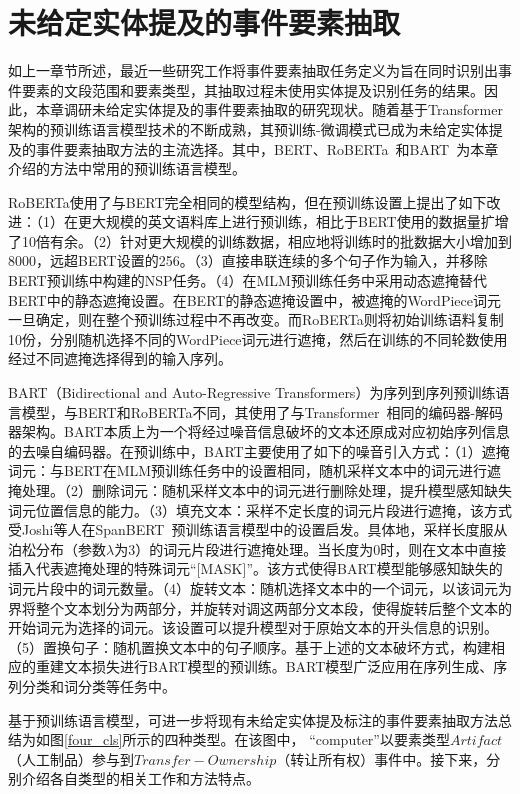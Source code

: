 \section{未给定实体提及的事件要素抽取}
\label{no_entity}
如上一章节所述，最近一些研究工作将事件要素抽取任务定义为旨在同时识别出事件要素的文段范围和要素类型，其抽取过程未使用实体提及识别任务的结果。因此，本章调研未给定实体提及的事件要素抽取的研究现状。随着基于Transformer架构的预训练语言模型技术的不断成熟，其预训练-微调模式已成为未给定实体提及的事件要素抽取方法的主流选择。其中，BERT、RoBERTa~\cite{liu2019roberta}和BART~\cite{lewis2020bart}为本章介绍的方法中常用的预训练语言模型。

RoBERTa使用了与BERT完全相同的模型结构，但在预训练设置上提出了如下改进：（1）在更大规模的英文语料库上进行预训练，相比于BERT使用的数据量扩增了10倍有余。（2）针对更大规模的训练数据，相应地将训练时的批数据大小增加到8000，远超BERT设置的256。（3）直接串联连续的多个句子作为输入，并移除BERT预训练中构建的NSP任务。（4）在MLM预训练任务中采用动态遮掩替代BERT中的静态遮掩设置。在BERT的静态遮掩设置中，被遮掩的WordPiece词元一旦确定，则在整个预训练过程中不再改变。而RoBERTa则将初始训练语料复制10份，分别随机选择不同的WordPiece词元进行遮掩，然后在训练的不同轮数使用经过不同遮掩选择得到的输入序列。

BART（Bidirectional and Auto-Regressive Transformers）为序列到序列预训练语言模型，与BERT和RoBERTa不同，其使用了与Transformer~\cite{vaswani2017attention}相同的编码器-解码器架构。BART本质上为一个将经过噪音信息破坏的文本还原成对应初始序列信息的去噪自编码器。在预训练中，BART主要使用了如下的噪音引入方式：（1）遮掩词元：与BERT在MLM预训练任务中的设置相同，随机采样文本中的词元进行遮掩处理。（2）删除词元：随机采样文本中的词元进行删除处理，提升模型感知缺失词元位置信息的能力。（3）填充文本：采样不定长度的词元片段进行遮掩，该方式受Joshi等人在SpanBERT~\cite{joshi2020spanbert}预训练语言模型中的设置启发。具体地，采样长度服从泊松分布（参数$\lambda$为3）的词元片段进行遮掩处理。当长度为0时，则在文本中直接插入代表遮掩处理的特殊词元“[MASK]”。该方式使得BART模型能够感知缺失的词元片段中的词元数量。（4）旋转文本：随机选择文本中的一个词元，以该词元为界将整个文本划分为两部分，并旋转对调这两部分文本段，使得旋转后整个文本的开始词元为选择的词元。该设置可以提升模型对于原始文本的开头信息的识别。（5）置换句子：随机置换文本中的句子顺序。基于上述的文本破坏方式，构建相应的重建文本损失进行BART模型的预训练。BART模型广泛应用在序列生成、序列分类和词分类等任务中。

基于预训练语言模型，可进一步将现有未给定实体提及标注的事件要素抽取方法总结为如图\ref{four_cls}所示的四种类型。在该图中，
“computer”以要素类型$Artifact$（人工制品）参与到$Transfer-Ownership$（转让所有权）事件中。接下来，分别介绍各自类型的相关工作和方法特点。

